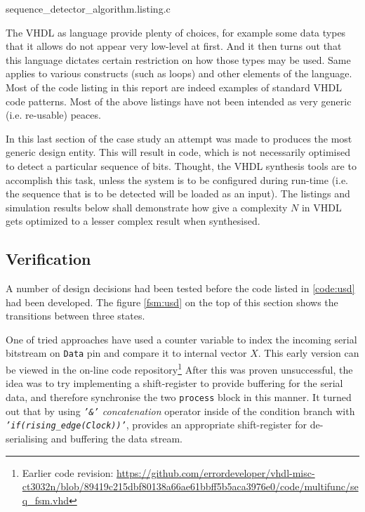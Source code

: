 \documentclass[10pt,a4paper]{report}
\begin{document}
\pagebreak

{sequence_detector_algorithm.listing.c}

 The VHDL as language provide plenty of choices,
 for example some data types that it allows do
 not appear very low-level at first. And it then
 turns out that this language dictates certain
 restriction on how those types may be used.
 Same applies to various constructs (such as loops)
 and other elements of the language. Most of the
 code listing in this report are indeed examples
 of standard VHDL code patterns. Most of the above
 listings have not been intended as very generic 
 (i.e. re-usable) peaces.

 In this last section of the case study an attempt
 was made to produces the most generic design entity.
 This will result in code, which is not necessarily
 optimised to detect a particular sequence of bits.
 Thought, the VHDL synthesis tools are to accomplish
 this task, unless the system is to be configured
 during run-time (i.e. the sequence that is to be
 detected will be loaded as an input).
 The listings and simulation results below shall
 demonstrate how give a complexity $N$ in VHDL
 gets optimized to a lesser complex result when
 synthesised.


\subsection{Verification}

 A number of design decisions had been tested
 before the code listed in \ref{code:usd} had
 been developed. The figure \ref{fsm:usd} on
 the top of this section shows the transitions
 between three states.

 One of tried approaches have used a counter
 variable to index the incoming serial bitstream
 on \texttt{Data} pin and compare it to internal
 vector $X$. This early version can be viewed
 in the on-line code repository\footnote{
 Earlier code revision:
 \url{https://github.com/errordeveloper/vhdl-misc-ct3032n/blob/89419c215dbf80138a66ae61bbff5b5aca3976e0/code/multifunc/seq_fsm.vhd}}
 After this was proven unsuccessful, the idea
 was to try implementing a shift-register
 to provide buffering for the serial data,
 and therefore synchronise the two \texttt{process}
 block in this manner. It turned out that by
 using \emph{\texttt{'\&'} concatenation}
 operator inside of the condition branch
 with \emph{\texttt{'if(rising\_edge(Clock))'}},
 provides an appropriate shift-register for
 de-serialising and buffering the data stream.
\end{document}
